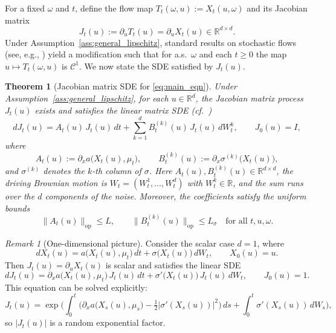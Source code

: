 \documentclass{tsp-short}
\newtheorem{theorem}{Theorem}[section]
\theoremstyle{remark}
\newtheorem{remark}{Remark}[section]
\theoremstyle{definition}
\begin{document}
For a fixed $\omega$ and $t$, define the flow map $T_t(\omega,u):=X_t(u,\omega)$ and its Jacobian matrix
\begin{equation*}
J_t(u):=\partial_u T_t(u)=\partial_u X_t(u)\in\mathbb{R}^{d\times d}.
\end{equation*}
Under Assumption~\ref{ass:general_lipschitz}, standard results on stochastic flows (see, e.g., \cite[Theorem~1.4.1]{Kunita1986}) yield a modification such that for a.s.\ $\omega$ and each $t\ge0$ the map $u\mapsto T_t(\omega,u)$ is $\mathcal{C}^1$.
We now state the SDE satisfied by $J_t(u)$.

\begin{theorem}[Jacobian matrix SDE for \eqref{eq:main_eqn}]\label{thm:jacobianSDE}
Under Assumption~\ref{ass:general_lipschitz}, for each $u\in\mathbb{R}^d$, the Jacobian matrix process $J_t(u)$ exists and satisfies the linear matrix SDE (cf.\ \cite{Kunita1986,dorogovtsev2023intermittency})
\begin{equation}
dJ_t(u)= A_t(u)\,J_t(u)\,dt + \sum_{k=1}^d B_t^{(k)}(u)\,J_t(u)\,dW_t^{k},\qquad J_0(u)=I,
\label{eq:JacSDE}
\end{equation}
where
\begin{equation*}
A_t(u):=\partial_x a\big(X_t(u),\mu_t\big),\qquad
B_t^{(k)}(u):=\partial_x \sigma^{(k)}\big(X_t(u)\big),
\end{equation*}
and $\sigma^{(k)}$ denotes the $k$-th column of $\sigma$.
Here $A_t(u),B_t^{(k)}(u)\in\mathbb{R}^{d\times d}$, the driving Brownian motion is $W_t=(W_t^1,\ldots,W_t^d)$ with $W_t^k\in\mathbb{R}$, and the sum runs over the $d$ components of the noise.
Moreover, the coefficients satisfy the uniform bounds
\begin{equation*}
\|A_t(u)\|_{\mathrm{op}}\le L,\qquad
\|B_t^{(k)}(u)\|_{\mathrm{op}}\le L_\sigma
\quad \text{for all }t,u,\omega.
\end{equation*}
\end{theorem}

\begin{remark}[One-dimensional picture]
Consider the scalar case $d=1$, where
\begin{equation*}
dX_t(u)=a\big(X_t(u),\mu_t\big)\,dt+\sigma\big(X_t(u)\big)\,dW_t,\qquad X_0(u)=u.
\end{equation*}
Then $J_t(u)=\partial_u X_t(u)$ is scalar and satisfies the linear SDE
\begin{equation*}
dJ_t(u)=\partial_x a\big(X_t(u),\mu_t\big)\,J_t(u)\,dt+\sigma'\big(X_t(u)\big)\,J_t(u)\,dW_t,\qquad J_0(u)=1.
\end{equation*}
This equation can be solved explicitly:
\begin{equation*}
J_t(u)=\exp\Big(\int_0^t\Big(\partial_x a\big(X_s(u),\mu_s\big)-\tfrac12|\sigma'(X_s(u))|^2\Big)\,ds+\int_0^t \sigma'(X_s(u))\,dW_s\Big),
\end{equation*}
so $|J_t(u)|$ is a random exponential factor.
\end{remark}
\end{document}
